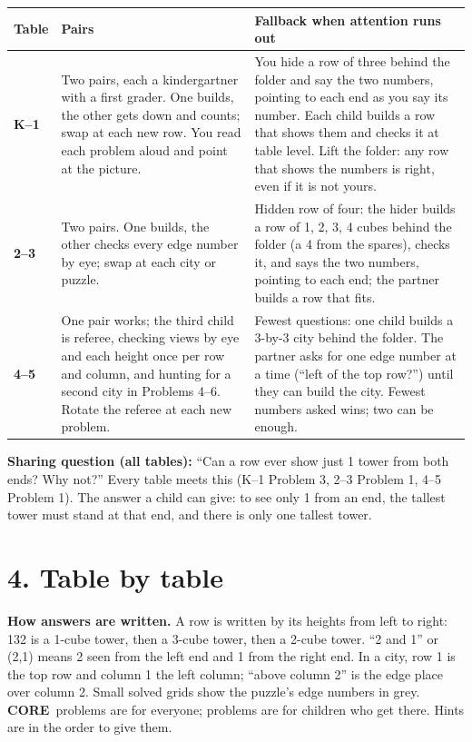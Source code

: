 \documentclass[11pt]{extarticle}
\newcommand{\core}{\colorbox{accent}{\color{white}\footnotesize\bfseries\,CORE\,}}
\newcommand{\further}{\fcolorbox{accent}{white}{\color{accent}\footnotesize\bfseries\,FURTHER\,}}
\begin{document}
\begin{xltabular}{\linewidth}{@{}>{\bfseries}p{1.25cm}X X@{}}
\toprule
Table & Pairs & Fallback when attention runs out \\
\midrule
\endhead
K--1 & Two pairs, each a kindergartner with a first grader. One builds, the other gets down and counts; swap at each new row. You read each problem aloud and point at the picture. & You hide a row of three behind the folder and say the two numbers, pointing to each end as you say its number. Each child builds a row that shows them and checks it at table level. Lift the folder: any row that shows the numbers is right, even if it is not yours. \\
2--3 & Two pairs. One builds, the other checks every edge number by eye; swap at each city or puzzle. & Hidden row of four: the hider builds a row of 1, 2, 3, 4 cubes behind the folder (a 4 from the spares), checks it, and says the two numbers, pointing to each end; the partner builds a row that fits. \\
4--5 & One pair works; the third child is referee, checking views by eye and each height once per row and column, and hunting for a second city in Problems 4--6. Rotate the referee at each new problem. & Fewest questions: one child builds a 3-by-3 city behind the folder. The partner asks for one edge number at a time (``left of the top row?'') until they can build the city. Fewest numbers asked wins; two can be enough. \\
\bottomrule
\end{xltabular}

\textbf{Sharing question (all tables):} ``Can a row ever show just 1 tower from both ends? Why not?'' Every table meets this (K--1 Problem 3, 2--3 Problem 1, 4--5 Problem 1). The answer a child can give: to see only 1 from an end, the tallest tower must stand at that end, and there is only one tallest tower.

\section{4. Table by table}

\textbf{How answers are written.} A row is written by its heights from left to right: 132 is a 1-cube tower, then a 3-cube tower, then a 2-cube tower. ``2 and 1'' or (2,1) means 2 seen from the left end and 1 from the right end. In a city, row 1 is the top row and column 1 the left column; ``above column 2'' is the edge place over column 2. Small solved grids show the puzzle's edge numbers in grey. \core{} problems are for everyone; \further{} problems are for children who get there. Hints are in the order to give them.
\end{document}
